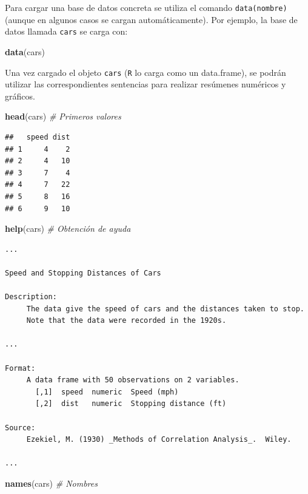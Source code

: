 \documentclass[]{book}
\newenvironment{Shaded}{\begin{snugshade}}{\end{snugshade}}
\newcommand{\KeywordTok}[1]{\textcolor[rgb]{0.13,0.29,0.53}{\textbf{#1}}}
\newcommand{\CommentTok}[1]{\textcolor[rgb]{0.56,0.35,0.01}{\textit{#1}}}
\newcommand{\NormalTok}[1]{#1}
\begin{document}
Para cargar una base de datos concreta se utiliza el comando
\texttt{data(nombre)} (aunque en algunos casos se cargan
automáticamente). Por ejemplo, la base de datos llamada \texttt{cars} se
carga con:

\begin{Shaded}
\begin{Highlighting}[]
\KeywordTok{data}\NormalTok{(cars)}
\end{Highlighting}
\end{Shaded}

Una vez cargado el objeto \texttt{cars} (\texttt{R} lo carga como un
data.frame), se podrán utilizar las correspondientes sentencias para
realizar resúmenes numéricos y gráficos.

\begin{Shaded}
\begin{Highlighting}[]
\KeywordTok{head}\NormalTok{(cars)  }\CommentTok{# Primeros valores}
\end{Highlighting}
\end{Shaded}

\begin{verbatim}
##   speed dist
## 1     4    2
## 2     4   10
## 3     7    4
## 4     7   22
## 5     8   16
## 6     9   10
\end{verbatim}

\begin{Shaded}
\begin{Highlighting}[]
\KeywordTok{help}\NormalTok{(cars)  }\CommentTok{# Obtención de ayuda}
\end{Highlighting}
\end{Shaded}

\begin{verbatim}
...

Speed and Stopping Distances of Cars

Description:
     The data give the speed of cars and the distances taken to stop.
     Note that the data were recorded in the 1920s.

...  

Format:
     A data frame with 50 observations on 2 variables.
       [,1]  speed  numeric  Speed (mph)            
       [,2]  dist   numeric  Stopping distance (ft) 
      
Source:
     Ezekiel, M. (1930) _Methods of Correlation Analysis_.  Wiley.
     
...  
\end{verbatim}

\begin{Shaded}
\begin{Highlighting}[]
\KeywordTok{names}\NormalTok{(cars)      }\CommentTok{# Nombres}
\end{Highlighting}
\end{Shaded}
\end{document}
